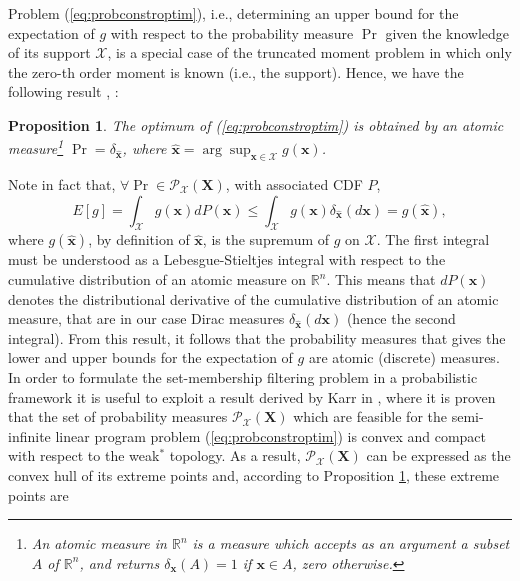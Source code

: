 \documentclass[twocolumn]{autart}
\newtheorem{proposition}{Proposition}{\normalfont}{\normalfont}
\newcommand{\DP}[1]{{#1}}
\begin{document}
Problem (\ref{eq:probconstroptim}), i.e.,
determining an upper bound for the expectation  of $g$ \DP{with respect to}  the probability measure $\Pr$ given the knowledge of its support $ \mathcal{X}$, is a special case
of the truncated moment problem  \cite{shohat1950problem,kreuin1977markov,lasserre2010moments} in which only the zero-th order moment is known (i.e., the support).
Hence, we have the following result \cite{karr1983extreme},  \cite[Lemma 3.1]{shapiro2001duality}:


\begin{proposition}
\label{prop:1}
The optimum of  (\ref{eq:probconstroptim}) is obtained by an atomic measure\footnote{An atomic measure in $\mathbb{R}^n$ is a measure which accepts as an argument a subset $A$ of $\mathbb{R}^n$, and returns $\delta_{\mathbf{x}}(A) = 1$ if $\mathbf{x} \in A$,  zero otherwise.} $\Pr=\delta_{\hat{\mathbf{x}}}$, where
$\hat{\mathbf{x}} =\arg\sup_{\mathbf{x} \in \mathcal{X}} g(\mathbf{x})$.
\end{proposition}
Note in fact that, $\forall \Pr \in \mathcal{P}_{\mathcal{X}}(\mathbf{X})$, with associated CDF $P$,
$$
E[g]=\int_{\mathcal{X}} g(\mathbf{x})dP(\mathbf{x})\leq \int_{\mathcal{X}} g(\mathbf{x})\delta_{\hat{\mathbf{x}}}(d\mathbf{x})=g(\hat{\mathbf{x}}),
$$
where $g(\hat{\mathbf{x}})$, by definition of $\hat{\mathbf{x}}$, is the supremum   of $g$ on $\mathcal{X}$.
  The first integral must be understood as a Lebesgue-Stieltjes integral \DP{with respect to}  the cumulative
  distribution of an atomic measure on $\mathbb{R}^n$. This means that $dP(\mathbf{x})$ denotes
  the distributional derivative of the cumulative distribution of an atomic measure,  that are in our case Dirac measures $\delta_{\hat{\mathbf{x}}}(d\mathbf{x})$ (hence the second integral).
From this result, it follows \DP{that the} probability measures that
gives the lower and upper bounds for the expectation of $g$ are atomic (discrete) measures.\\
In order to formulate the set-membership filtering problem in a probabilistic framework \DP{it} is useful to exploit a result
derived by Karr in \cite{karr1983extreme}, where it is  proven that  the set of probability measures  $\mathcal{P}_{\mathcal{X}}(\mathbf{X})$ which are feasible for the semi-infinite linear program
problem (\ref{eq:probconstroptim}) is convex and compact with respect to the weak$^*$ topology.
As a result, $\mathcal{P}_{\mathcal{X}}(\mathbf{X})$  can be expressed as the convex hull of its extreme points and, according to Proposition \ref{prop:1}, these extreme points are
\end{document}
